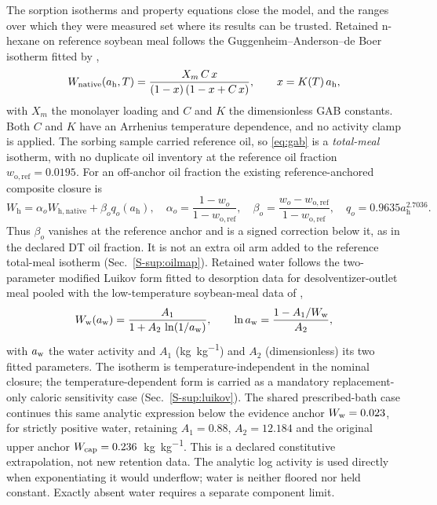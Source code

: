 The sorption isotherms and property equations close the model, and the
ranges over which they were measured set where its results can be trusted.
Retained n-hexane on reference soybean meal follows the
Guggenheim--Anderson--de Boer isotherm fitted by \citet{cardarelli1996hexane},
\begin{equation}
W_{\mathrm{native}}(a_{\mathrm{h}},T) = \frac{X_{m}\,C\,x}{(1-x)\,(1-x+C\,x)},
\qquad x = K(T)\,a_{\mathrm{h}},
\label{eq:gab}
\end{equation}
with $X_{m}$ the monolayer loading and $C$ and $K$ the dimensionless GAB
constants. Both $C$ and $K$ have an Arrhenius temperature dependence, and
no activity clamp is applied. The
sorbing sample carried reference oil, so \eqref{eq:gab} is a \emph{total-meal}
isotherm, with no duplicate oil inventory at the reference oil fraction
$w_{\mathrm{o,ref}}=0.0195$. For an off-anchor oil fraction the existing
reference-anchored composite closure is
\begin{equation}
W_{\mathrm{h}}=\alpha_o W_{\mathrm{h,native}}+\beta_o q_o(a_{\mathrm h}),
\quad \alpha_o=\frac{1-w_o}{1-w_{\mathrm{o,ref}}},\quad
\beta_o=\frac{w_o-w_{\mathrm{o,ref}}}{1-w_{\mathrm{o,ref}}},\quad
q_o=0.9635a_{\mathrm h}^{2.7036}.
\label{eq:oilanchorcorrection}
\end{equation}
Thus $\beta_o$ vanishes at the reference anchor and is a signed correction
below it, as in the declared DT oil fraction. It is not an extra oil arm
added to the reference total-meal isotherm (Sec.~\ref*{S-sup:oilmap}). Retained
water follows the two-parameter modified Luikov form fitted to desorption data
for desolventizer-outlet meal pooled with the low-temperature soybean-meal
data of \citet{pixton1975moisture} \citep{luz2006isotermas,luikov1975systems},
\begin{equation}
W_{\mathrm{w}}(a_{\mathrm{w}}) = \frac{A_{1}}{1 + A_{2}\,\ln(1/a_{\mathrm{w}})},
\qquad
\ln a_{\mathrm{w}} = \frac{1 - A_{1}/W_{\mathrm{w}}}{A_{2}},
\label{eq:luikov}
\end{equation}
with $a_{\mathrm{w}}$ the water activity and $A_{1}$ (\si{\kilogram\per\kilogram}) and
$A_{2}$ (dimensionless) its two fitted parameters. The isotherm is
temperature-independent in the nominal closure; the temperature-dependent
form is carried as a mandatory replacement-only caloric sensitivity case
(Sec.~\ref*{S-sup:luikov}). The shared prescribed-bath case
continues this same analytic expression below the evidence anchor
$W_{\mathrm w}=0.023$, for strictly positive water, retaining
$A_1=0.88$, $A_2=12.184$ and the original upper anchor
$W_{\mathrm{cap}}=0.236$~\si{\kilogram\per\kilogram}. This is a declared constitutive
extrapolation, not new retention data. The analytic log activity is used
directly when exponentiating it would underflow; water is neither floored
nor held constant. Exactly absent water requires a separate component limit.

